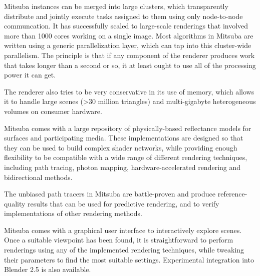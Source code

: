  Mitsuba instances can be merged into large clusters, which transparently distribute and
jointly execute tasks assigned to them using only node-to-node communcation. It has successfully
scaled to large-scale renderings that involved more than 1000 cores working on a single image.
Most algorithms in Mitsuba  are written using a generic parallelization layer, which can tap
into this cluster-wide parallelism. The principle is that if any component of the renderer produces
work that takes longer than a second or so, it at least ought to use all of the processing power
it can get.

The renderer also tries to be very conservative in its use of memory, which allows it to handle
large scenes (>30 million triangles) and multi-gigabyte heterogeneous volumes on consumer hardware.

 Mitsuba comes with a large repository of physically-based
reflectance models for surfaces and participating media. These implementations
are designed so that they can be used to build complex shader networks, while
providing enough flexibility to be compatible with a wide range of different
rendering techniques, including path tracing, photon mapping, hardware-accelerated rendering
and bidirectional methods.

The unbiased path tracers in Mitsuba are battle-proven and produce
reference-quality results that can be used for predictive rendering, and to verify
implementations of other rendering methods.

Mitsuba comes with a graphical user interface to interactively explore scenes. Once a suitable
viewpoint has been found, it is straightforward to perform renderings using any of the
implemented rendering techniques, while tweaking their parameters to find the most suitable
settings. Experimental integration into Blender 2.5 is also available.

